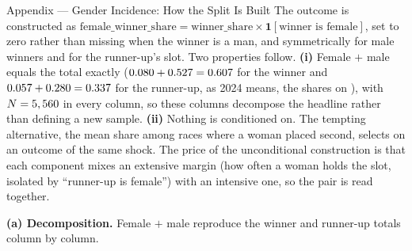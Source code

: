 
\begin{frame}{Appendix --- Gender Incidence: How the Split Is Built}
\hypertarget{app:gender}{}
\scriptsize
The outcome is constructed as $\text{female\_winner\_share} = \text{winner\_share} \times \mathbf{1}[\text{winner is female}]$, set to zero rather than missing when the winner is a man, and symmetrically for male winners and for the runner-up's slot. Two properties follow. \textbf{(i)} Female $+$ male equals the total exactly ($0.080+0.527=0.607$ for the winner and $0.057+0.280=0.337$ for the runner-up, as 2024 means, the shares on \hyperlink{src:spine1}{}), with $N=5,560$ in every column, so these columns decompose the headline rather than defining a new sample. \textbf{(ii)} Nothing is conditioned on. The tempting alternative, the mean share among races where a woman placed second, selects on an outcome of the same shock. The price of the unconditional construction is that each component mixes an extensive margin (how often a woman holds the slot, isolated by ``runner-up is female'') with an intensive one, so the pair is read together.

\medskip
\textbf{(a) Decomposition.} Female $+$ male reproduce the winner and runner-up totals column by column.
\begin{center}
\resizebox{\linewidth}{!}{}
\end{center}
\medskip
\footnotesize \hyperlink{app:gendergap}{}\hfill\hyperlink{src:gender}{}
\end{frame}
